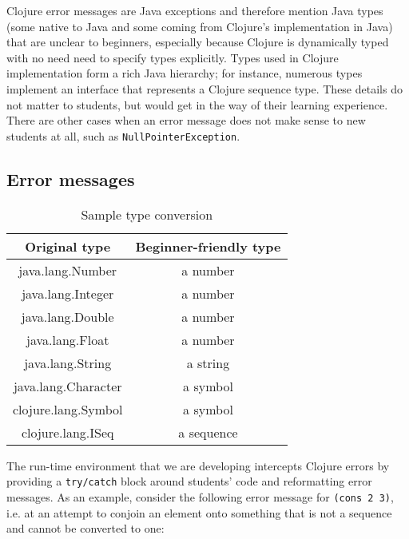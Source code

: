 \documentclass[submission,copyright,creativecommons]{eptcs}
\newcommand{\allcomments}[1]{{#1}}
\newcommand{\elenacomment}[1]{{\bf \textcolor{ForestGreen}{\allcomments{{#1}}}}}
\newcommand{\stephencomment}[1]{{\bf \color{StephensBlue}{\allcomments{{#1}}}}} %
\newcommand{\joecomment}[1]{{\bf \color{JoesGold}{\allcomments{{#1}}}}}
\begin{document}
Clojure error messages are Java exceptions and therefore mention Java types (some native to Java and some coming from Clojure's implementation in Java) that are unclear to beginners, especially because Clojure is dynamically typed with no need need to specify types explicitly. 
Types used in Clojure implementation form a rich Java hierarchy; for instance, numerous types implement an interface that represents a Clojure sequence type. 
These details do not matter to students, but would get in the way of their learning experience. There are other cases when an error message does not make sense to new students at all, such as {\tt NullPointerException}. 

\subsection{Error messages}\label{subsec:errors}
\begin{table}[t]
\centering
\begin{tabular}{|c|c|}
\hline
Original type & Beginner-friendly type \\
\hline
java.lang.Number & a number \\
java.lang.Integer & a number \\
java.lang.Double  & a number \\
java.lang.Float & a number \\
java.lang.String & a string \\
java.lang.Character & a symbol \\
clojure.lang.Symbol  & a symbol \\
clojure.lang.ISeq & a sequence \\
\hline
\end{tabular}
\caption{Sample type conversion}\label{table:types}
\end{table}

The run-time environment that we are developing intercepts Clojure errors by providing a {\tt try/catch} block around students' code and reformatting error messages. 
As an example, consider the following error message for {\tt (cons 2 3)}, i.e. at an attempt to conjoin an element onto something that is not a sequence and cannot be converted to one:
\end{document}
